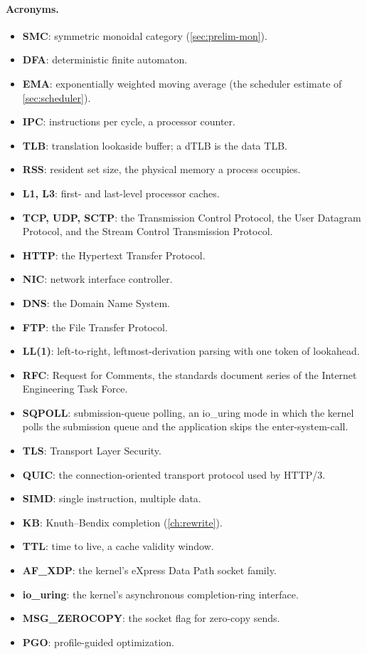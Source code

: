 \paragraph{Acronyms.}
\begin{itemize}
\item \textbf{SMC}: symmetric monoidal category (\autoref{sec:prelim-mon}).
\item \textbf{DFA}: deterministic finite automaton.
\item \textbf{EMA}: exponentially weighted moving average (the
  scheduler estimate of \autoref{sec:scheduler}).
\item \textbf{IPC}: instructions per cycle, a processor counter.
\item \textbf{TLB}: translation lookaside buffer; a dTLB is the data
  TLB.
\item \textbf{RSS}: resident set size, the physical memory a process
  occupies.
\item \textbf{L1, L3}: first- and last-level processor caches.
\item \textbf{TCP, UDP, SCTP}: the Transmission Control Protocol, the
  User Datagram Protocol, and the Stream Control Transmission Protocol.
\item \textbf{HTTP}: the Hypertext Transfer Protocol.
\item \textbf{NIC}: network interface controller.
\item \textbf{DNS}: the Domain Name System.
\item \textbf{FTP}: the File Transfer Protocol.
\item \textbf{LL(1)}: left-to-right, leftmost-derivation parsing with
  one token of lookahead.
\item \textbf{RFC}: Request for Comments, the standards document series
  of the Internet Engineering Task Force.
\item \textbf{SQPOLL}: submission-queue polling, an io\_uring mode in
  which the kernel polls the submission queue and the application skips
  the enter-system-call.
\item \textbf{TLS}: Transport Layer Security.
\item \textbf{QUIC}: the connection-oriented transport protocol used
  by HTTP/3.
\item \textbf{SIMD}: single instruction, multiple data.
\item \textbf{KB}: Knuth--Bendix completion (\autoref{ch:rewrite}).
\item \textbf{TTL}: time to live, a cache validity window.
\item \textbf{AF\_XDP}: the kernel's eXpress Data Path socket family.
\item \textbf{io\_uring}: the kernel's asynchronous completion-ring
  interface.
\item \textbf{MSG\_ZEROCOPY}: the socket flag for zero-copy sends.
\item \textbf{PGO}: profile-guided optimization.
\end{itemize}

